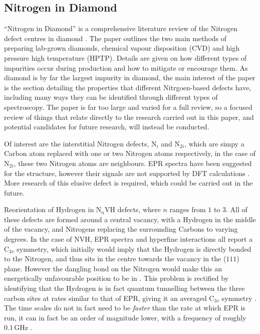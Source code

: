 \documentclass[10pt,a4paper,twocolumn,twoside]{extarticle}
\begin{document}
\subsection{Nitrogen in Diamond}
``Nitrogen in Diamond'' is a comprehensive literature review of the Nitrogen defect centres in diamond \cite{NitrogeninDiamond}. 
The paper outlines the two main methods of preparing lab-grown diamonds, chemical vapour disposition (CVD) and high pressure high temperature (HPTP). Details are given on how different types of impurities occur during production and how to mitigate or encourage them. As diamond is by far the largest impurity in diamond, the main interest of the paper is the section detailing the properties that different Nitrgoen-based defects have, including many ways they can be identified through different types of spectroscopy. The paper is far too large and varied for a full review, so a focused review of things that relate directly to the research carried out in this paper, and potential candidates for future research, will instead be conducted. 

Of interest are the interstitial Nitrogen defects, N$_i$ and N$_{2i}$, which are simpy a Carbon atom replaced with one or two Nitrogen atoms respectively, in the case of N$_{2i}$, these two Nitrogen atoms are neighbours. EPR spectra have been suggested for the structure, however their signals are not supported by DFT calculations \cite{Atumi_2013}. More research of this elusive defect is required, which could be carried out in the future.

Reorientation of Hydrogen in N$_n$VH defects, where $n$ ranges from $1$ to $3$. All of these defects are formed around a central vacancy, with a Hydrogen in the middle of the vacancy, and Nitrogens replacing the surrounding Carbons to varying degrees. In the case of NVH, EPR spectra and hyperfine interactions all report a C$_{3v}$ symmetry, which initially would imply that the Hydrogen is directly bonded to the Nitrogen, and thus sits in the centre towards the vacancy in the ($1 1 1$) plane. However the dangling bond on the Nitrogen would make this an energetically unfavourable position to be in \cite{Goss_NVH}. This problem is rectified by identifying that the Hydrogen is in fact quantum tunnelling between the three carbon sites at rates similar to that of EPR, giving it an averaged C$_{3v}$ symmetry \cite{Shaw_QT_VH}. The time scales do not in fact need to be \emph{faster} than the rate at which EPR is run, it can in fact be an order of magnitude lower, with a frequency of roughly $0.1$\,GHz \cite{Edwards_N2VH_rate}.
\end{document}
